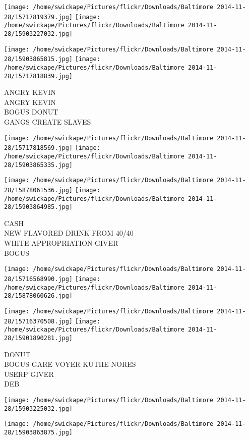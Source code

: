 \documentclass[10pt,letterpaper]{article}
\begin{document}
\texttt{[image: /home/swickape/Pictures/flickr/Downloads/Baltimore 2014-11-28/15717819379.jpg]}
\texttt{[image: /home/swickape/Pictures/flickr/Downloads/Baltimore 2014-11-28/15903227032.jpg]}

\texttt{[image: /home/swickape/Pictures/flickr/Downloads/Baltimore 2014-11-28/15903865815.jpg]}
\texttt{[image: /home/swickape/Pictures/flickr/Downloads/Baltimore 2014-11-28/15717818839.jpg]}

ANGRY KEVIN\\
ANGRY KEVIN\\
BOGUS DONUT\\
GANGS CREATE SLAVES\\
\pagebreak

\texttt{[image: /home/swickape/Pictures/flickr/Downloads/Baltimore 2014-11-28/15717818569.jpg]}
\texttt{[image: /home/swickape/Pictures/flickr/Downloads/Baltimore 2014-11-28/15903865335.jpg]}

\texttt{[image: /home/swickape/Pictures/flickr/Downloads/Baltimore 2014-11-28/15878061536.jpg]}
\texttt{[image: /home/swickape/Pictures/flickr/Downloads/Baltimore 2014-11-28/15903864985.jpg]}

CASH\\
NEW FLAVORED DRINK FROM 40/40\\
WHITE APPROPRIATION GIVER\\
BOGUS\\
\pagebreak

\texttt{[image: /home/swickape/Pictures/flickr/Downloads/Baltimore 2014-11-28/15716568990.jpg]}
\texttt{[image: /home/swickape/Pictures/flickr/Downloads/Baltimore 2014-11-28/15878060626.jpg]}

\texttt{[image: /home/swickape/Pictures/flickr/Downloads/Baltimore 2014-11-28/15716370508.jpg]}
\texttt{[image: /home/swickape/Pictures/flickr/Downloads/Baltimore 2014-11-28/15901890281.jpg]}

DONUT\\
BOGUS GARE VOYER KUTHE NORES\\
USERP GIVER\\
DEB\\
\pagebreak

\texttt{[image: /home/swickape/Pictures/flickr/Downloads/Baltimore 2014-11-28/15903225032.jpg]}

\vspace{0.25in}
\texttt{[image: /home/swickape/Pictures/flickr/Downloads/Baltimore 2014-11-28/15903863875.jpg]}
\end{document}
